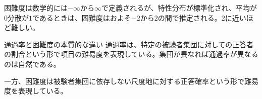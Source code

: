 \documentclass[12pt]{jarticle}
\begin{document}
困難度は数学的には$-\infty$から$\infty$で定義されるが、特性分布が標準化され、平均が$0$分散が$1$であるときは、困難度はおよそ$-2$から$2$の間で推定される。$2$に近いほど難しい。
\begin{itembox}[l]{通過率と困難度の本質的な違い}
  通過率は、特定の被験者集団に対しての正答者の割合という形で項目の難易度を表現している。集団が異なれば通過率が異なるのは自然である。

  一方、困難度は被験者集団に依存しない尺度地に対する正答確率という形で難易度を表現している。
\end{itembox}
\end{document}
